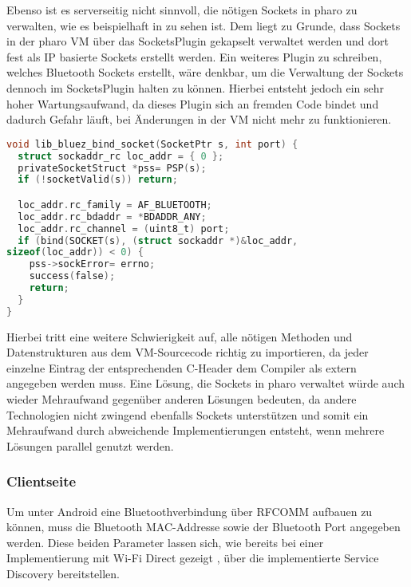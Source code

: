         Ebenso ist es serverseitig nicht sinnvoll, die nötigen Sockets in pharo zu verwalten, wie es beispielhaft in  zu sehen ist. Dem liegt zu Grunde, dass Sockets in der pharo VM über das SocketsPlugin \cite{pharoSocket} gekapselt verwaltet werden und dort fest als IP basierte Sockets erstellt werden. Ein weiteres Plugin zu schreiben, welches Bluetooth Sockets erstellt, wäre denkbar, um die Verwaltung der Sockets dennoch im SocketsPlugin halten zu können. Hierbei entsteht jedoch ein sehr hoher Wartungsaufwand, da dieses Plugin sich an fremden Code bindet und dadurch Gefahr läuft, bei Änderungen in der VM nicht mehr zu funktionieren.
        
        \begin{lstlisting}[frame=bt, label={lst:bluetooth:pharo}, language=C, caption=Pharo Bluetooth Sockets als Plugin (Servercode in C)]
void lib_bluez_bind_socket(SocketPtr s, int port) {
  struct sockaddr_rc loc_addr = { 0 };
  privateSocketStruct *pss= PSP(s);
  if (!socketValid(s)) return;

  loc_addr.rc_family = AF_BLUETOOTH;
  loc_addr.rc_bdaddr = *BDADDR_ANY;
  loc_addr.rc_channel = (uint8_t) port;
  if (bind(SOCKET(s), (struct sockaddr *)&loc_addr,
sizeof(loc_addr)) < 0) {
    pss->sockError= errno;
    success(false);
    return;
  }
}
        \end{lstlisting}  
        Hierbei tritt eine weitere Schwierigkeit auf, alle nötigen Methoden und Datenstrukturen aus dem VM-Sourcecode richtig zu importieren, da jeder einzelne Eintrag der entsprechenden C-Header dem Compiler als extern angegeben werden muss.
        Eine Lösung, die Sockets in pharo verwaltet würde auch wieder Mehraufwand gegenüber anderen Lösungen bedeuten, da andere Technologien nicht zwingend ebenfalls Sockets unterstützen und somit ein Mehraufwand durch abweichende Implementierungen entsteht, wenn mehrere Lösungen parallel genutzt werden.        
        
        \subsubsection{Clientseite}
        Um unter Android eine Bluetoothverbindung über RFCOMM aufbauen zu können, muss die Bluetooth MAC-Addresse sowie der Bluetooth Port angegeben werden. Diese beiden Parameter lassen sich, wie bereits bei einer Implementierung mit \linebreak Wi-Fi Direct gezeigt \cite{aiProject}, über die implementierte Service Discovery \linebreak bereitstellen.
        
